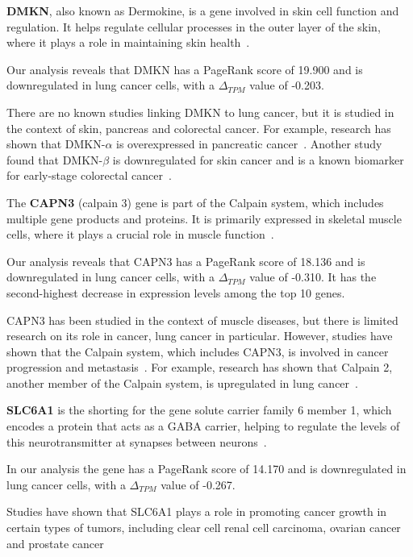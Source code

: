 \textbf{DMKN}, also known as Dermokine, is a gene involved in skin cell function and regulation.
It helps regulate cellular processes in the outer layer of the skin, where it plays a role in maintaining skin health~\cite{Naso2007Deromokine}.

Our analysis reveals that DMKN has a PageRank score of 19.900 and is downregulated in lung cancer cells,
with a $\Delta_{TPM}$ value of -0.203.

There are no known studies linking DMKN to lung cancer, but it is studied in the context of skin, pancreas and colorectal cancer.
For example, research has shown that DMKN-$\alpha$ is overexpressed in pancreatic cancer~\cite{Zhang2022DMKN}.
Another study found that DMKN-$\beta$ is downregulated for skin cancer and is a known biomarker for early-stage colorectal cancer~\cite{Hasegawa2012Dermokine}.
\newline


The \textbf{CAPN3} (calpain 3) gene is part of the Calpain system, which includes multiple gene products and proteins.
It is primarily expressed in skeletal muscle cells, where it plays a crucial role in muscle function~\cite{Spinozzi2021Calpain}.

Our analysis reveals that CAPN3 has a PageRank score of 18.136 and is downregulated in lung cancer cells,
with a $\Delta_{TPM}$ value of -0.310.
It has the second-highest decrease in expression levels among the top 10 genes.

CAPN3 has been studied in the context of muscle diseases, but there is limited research on its role in cancer, lung cancer in particular.
However, studies have shown that the Calpain system, which includes CAPN3, is involved in cancer progression and metastasis~\cite{Storr2011Calpain}.
For example, research has shown that Calpain 2, another member of the Calpain system, is upregulated in lung cancer~\cite{Xu2019Calpain}.
\newline

\textbf{SLC6A1} is the shorting for the gene solute carrier family 6 member 1,
which encodes a protein that acts as a GABA carrier,
helping to regulate the levels of this neurotransmitter at synapses between neurons~\cite{Chen2020SLC6A1}.

In our analysis the gene has a PageRank score of 14.170 and is downregulated in lung cancer cells,
with a $\Delta_{TPM}$ value of -0.267.

Studies have shown that SLC6A1 plays a role in promoting cancer growth in certain types of tumors,
including clear cell renal cell carcinoma, ovarian cancer and prostate cancer~\cite{Chen2020SLC6A1}
\newline

